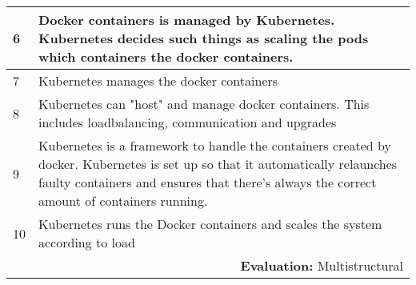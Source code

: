 \begin{longtable}{|p{0.3cm}|p{14.7cm}|}
6 & Docker containers is managed by Kubernetes. Kubernetes decides such things as scaling the pods which containers the docker containers. \\ \hline

7 & Kubernetes manages the docker containers \\ \hline

8 & Kubernetes can "host" and manage docker containers. This includes loadbalancing, communication and upgrades \\ \hline

9 & Kubernetes is a framework to handle the containers created by docker. Kubernetes is set up so that it automatically relaunches faulty containers and ensures that there's always the correct amount of containers running. \\ \hline

10 & Kubernetes runs the Docker containers and scales the system according to load\\ \hline

\multicolumn{2}{r}{\textbf{Evaluation:} Multistructural} \\ 
\end{longtable}
\normalsize



